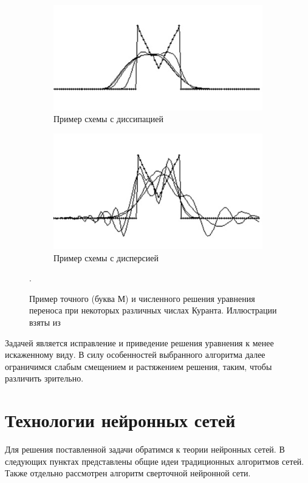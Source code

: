 \documentclass[12pt, a4paper]{article}
\begin{document}
\vspace{-2em}
\begin{figure}[!h]
	\centering
	\begin{subfigure}[t]{0.45\textwidth}
		\centering
		\includegraphics[width=\textwidth]{prim1}
		\caption{Пример схемы с диссипацией}
	\end{subfigure}
	\quad\quad\quad
	\begin{subfigure}[t]{0.45\textwidth}
		\centering
		\includegraphics[width=\textwidth]{prim2}
		\caption{Пример схемы с дисперсией}
	\end{subfigure}
	\caption{Пример точного (буква М) и численного решения уравнения переноса при некоторых различных числах Куранта. Иллюстрации взяты из \cite[c.416]{1}} .
\end{figure}
\vspace{-2em}
Задачей является исправление и приведение решения уравнения к менее искаженному виду. В силу особенностей выбранного алгоритма далее ограничимся слабым смещением и растяжением решения, таким, чтобы различить зрительно. 

\newpage

\section{Технологии нейронных сетей}
Для решения поставленной задачи обратимся к теории нейронных сетей. В следующих пунктах представлены общие идеи традиционных алгоритмов сетей. Также отдельно рассмотрен алгоритм сверточной нейронной сети.
\end{document}
